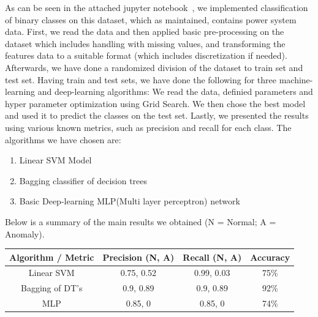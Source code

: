 \documentclass[english,12pt]{article}
\begin{document}
As can be seen in the attached jupyter notebook~\cite{Jupyter}, we implemented classification of binary classes on this dataset,
which as maintained, contains power system data. First, we read the data and then applied basic pre-processing
on the dataset which includes handling with missing values, and transforming the features data to a suitable
format (which includes discretization if needed). Afterwards, we have done a randomized division of the dataset
to train set and test set. Having train and test sets, we have done the following for three machine-learning
and deep-learning algorithms:
We read the data, definied parameters and hyper parameter optimization using Grid Search. We then chose the best
model and used it to predict the classes on the test set. Lastly, we presented the results using various known
metrics, such as precision and recall for each class.
The algorithms we have chosen are:

\begin{enumerate}
  \item Linear SVM Model
  \item Bagging classifier of decision trees
  \item Basic Deep-learning MLP(Multi layer perceptron) network
\end{enumerate}

Below is a summary of the main results we obtained (N = Normal; A = Anomaly).

\begin{center}
  \begin{tabular}{cccc}
  \hline
  Algorithm / Metric & Precision (N, A) & Recall (N, A) & Accuracy \\
  \hline
  Linear SVM & 0.75, 0.52 & 0.99, 0.03 & 75\% \\
  \hline
  Bagging of DT's & 0.9, 0.89 & 0.9, 0.89 & 92\% \\
  \hline
  MLP & 0.85, 0 & 0.85, 0 & 74\% \\
  \hline
  \end{tabular}
  \label{table1}
\end{center}

\end{document}
